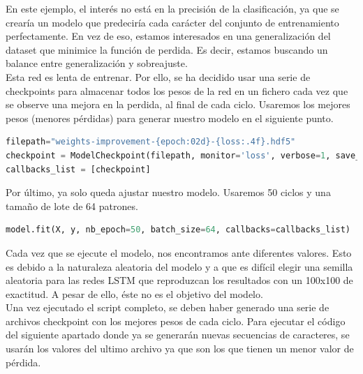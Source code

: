 En este ejemplo, el interés no está en la precisión de la clasificación, ya que se crearía un modelo que predeciría cada carácter del conjunto de entrenamiento perfectamente. En vez de eso, estamos interesados en una generalización del dataset que minimice la función de perdida. Es decir, estamos buscando un balance entre generalización y sobreajuste.\\
Esta red es lenta de entrenar. Por ello, se ha decidido usar una serie de checkpoints para almacenar todos los pesos de la red en un fichero cada vez que se observe una mejora en la perdida, al final de cada ciclo. Usaremos los mejores pesos (menores pérdidas) para generar nuestro modelo en el siguiente punto.
\begin{lstlisting}[language=Python]
filepath="weights-improvement-{epoch:02d}-{loss:.4f}.hdf5"
checkpoint = ModelCheckpoint(filepath, monitor='loss', verbose=1, save_best_only=True, mode='min')
callbacks_list = [checkpoint]
\end{lstlisting}
Por último, ya solo queda ajustar nuestro modelo. Usaremos 50 ciclos y una tamaño de lote de 64 patrones.
\begin{lstlisting}[language=Python]
model.fit(X, y, nb_epoch=50, batch_size=64, callbacks=callbacks_list)
\end{lstlisting}
Cada vez que se ejecute el modelo, nos encontramos ante diferentes valores. Esto es debido a la naturaleza aleatoria del modelo y a que es difícil elegir una semilla aleatoria para las redes LSTM que reproduzcan los resultados con un 100x100 de exactitud. A pesar de ello, éste no es el objetivo del modelo.\\
Una vez ejecutado el script completo, se deben haber generado una serie de archivos checkpoint con los mejores pesos de cada ciclo. Para ejecutar el código del siguiente apartado donde ya se generarán nuevas secuencias de caracteres, se usarán los valores del ultimo archivo ya que son los que tienen un menor valor de pérdida.
